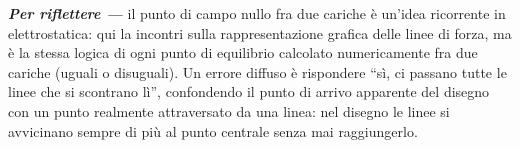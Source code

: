 \documentclass[11pt,a4paper]{scrartcl}
\newenvironment{riflessione}{\par\noindent\textit{\textbf{Per riflettere ---} }}{\par}
\begin{document}
\begin{riflessione}
il punto di campo nullo fra due cariche è un'idea ricorrente in elettrostatica: qui la incontri
sulla rappresentazione grafica delle linee di forza, ma è la stessa logica di ogni punto di
equilibrio calcolato numericamente fra due cariche (uguali o disuguali). Un errore diffuso è
rispondere ``sì, ci passano tutte le linee che si scontrano lì'', confondendo il punto di arrivo
apparente del disegno con un punto realmente attraversato da una linea: nel disegno le linee si
avvicinano sempre di più al punto centrale senza mai raggiungerlo.
\end{riflessione}
\end{document}
